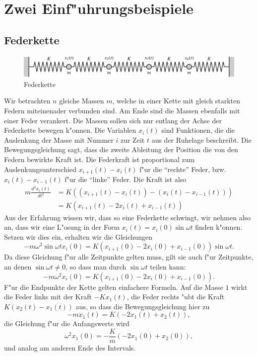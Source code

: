 \section{Zwei Einf"uhrungsbeispiele}
\subsection{Federkette}
\begin{figure}
\begin{center}
\includegraphics[width=\hsize]{images/e-1}
\end{center}
\caption{Federkette}
\end{figure}
Wir betrachten $n$ gleiche Massen $m$, welche in einer Kette mit gleich
starkten Federn miteinenader verbunden sind. Am Ende sind die Massen
ebenfalls mit einer Feder verankert.
Die Massen sollen sich nur entlang der Achse der Federkette bewegen k"onnen.
Die Variablen $x_i(t)$ sind Funktionen, die die Auslenkung der Masse mit
Nummer $i$ zur Zeit $t$ aus der Ruhelage beschreibt. Die Bewegungsgleichung sagt,
dass die zweite Ableitung der Position die von den Federn bewirkte Kraft
ist. Die Federkraft ist proportional zum Auslenkungsunterschied
$x_{i+1}(t)-x_i(t)$ f"ur die ``rechte'' Feder, bzw.~
$x_{i}(t)-x_{i-1}(t)$ f"ur die ``linke'' Feder.
Die Kraft ist also
\begin{align*}
m\frac{d^2x_i(t)}{dt^2}
&=K((x_{i+1}(t)-x_i(t))-(x_i(t)-x_{i-1}(t)))\\
&=K(x_{i+1}(t)-2x_i(t)+x_{i-1}(t))
\end{align*}
Aus der Erfahrung wissen wir, dass so eine Federkette schwingt, wir nehmen also
an, dass wir eine L"osung in der Form $x_i(t)=x_i(0)\sin\omega t$ finden
k"onnen. Setzen wir dies ein, erhalten wir die Gleichungen
\[
-m\omega^2\sin\omega t x_i(0)=K(x_{i+1}(0)-2x_i(0)+x_{i-1}(0))\sin\omega t.
\]
Da diese Gleichung f"ur alle Zeitpunkte gelten muss, gilt sie auch f"ur
Zeitpunkte, an denen $\sin\omega t\ne 0$, so dass man durch $\sin\omega t$
teilen kann:
\[
-m\omega^2 x_i(0)=K(x_{i+1}(0)-2x_i(0)+x_{i-1}(0)).
\]
F"ur die Endpunkte der Kette gelten einfachere Formeln. Auf die Masse $1$
wirkt die Feder links mit der Kraft $-Kx_1(t)$, die Feder rechts "ubt die
Kraft $K(x_2(t)-x_1(t))$ aus, so dass die Bewegungsgleichung hier zu
\[
-m\ddot x_1(t)=K(-2x_1(t)+x_2(t)),
\]
die Gleichung f"ur die Anfangswerte wird
\[
\omega^2 x_1(0)=-\frac{K}{m}(-2x_1(0)+x_2(0)),
\]
und analog am anderen Ende des Intervals.

